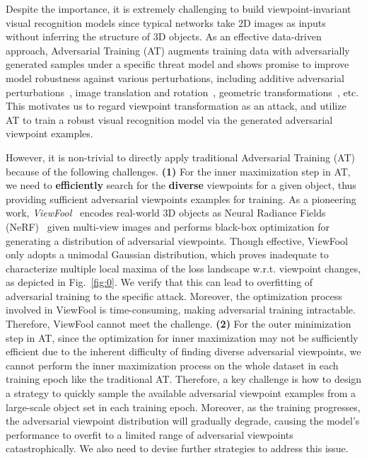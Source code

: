 \documentclass[10pt,journal,compsoc]{IEEEtran}
\begin{document}
Despite the importance, it is extremely challenging to build viewpoint-invariant visual recognition models since typical networks take 2D images as inputs without inferring the structure of 3D objects. As an effective data-driven approach, Adversarial Training (AT) augments training data with adversarially generated samples under a specific threat model and shows promise to improve model robustness against various perturbations, including additive adversarial perturbations~\cite{madry2017towards,zhang2019theoretically}, image translation and rotation~\cite{engstrom2019exploring}, geometric transformations~\cite{kanbak2018geometric}, etc. This motivates us to regard viewpoint transformation as an attack, and utilize AT to train a robust visual recognition model via the generated adversarial viewpoint examples. 

However, it is non-trivial to directly apply traditional Adversarial Training (AT) because of the following challenges. \textbf{(1)} For the inner maximization step in AT, we need to \textbf{efficiently} search for the \textbf{diverse} viewpoints for a given object, thus providing sufficient adversarial viewpoints examples for training. As a pioneering work, \emph{ViewFool}~\cite{dong2022viewfool} encodes real-world 3D objects as Neural Radiance Fields (NeRF)~\cite{mildenhall2020nerf} given multi-view images and performs black-box optimization for generating a distribution of adversarial viewpoints. Though effective, ViewFool only adopts a unimodal Gaussian distribution, which proves inadequate to characterize multiple local maxima of the loss landscape w.r.t. viewpoint changes, as depicted in Fig.~\ref{fig:0}. We verify that this can lead to overfitting of adversarial training to the specific attack. Moreover, the optimization process involved in ViewFool is time-consuming, making adversarial training intractable. Therefore, ViewFool cannot meet the challenge. \textbf{(2)} For the outer minimization step in AT, since the optimization for inner maximization may not be sufficiently efficient due to the inherent difficulty of finding diverse adversarial viewpoints, we cannot perform the inner maximization process on the whole dataset in each training epoch like the traditional AT. Therefore, a key challenge is how to design a strategy to quickly sample the available adversarial viewpoint examples from a large-scale object set in each training epoch. %
Moreover, as the training progresses, the adversarial viewpoint distribution will gradually degrade, causing the model's performance to overfit to a limited range of adversarial viewpoints catastrophically. We also need to devise further strategies to address this issue.
\end{document}
